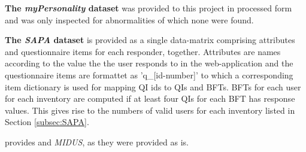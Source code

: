 \textbf{The \textit{myPersonality} dataset} was provided to this project in processed form and was only inspected for abnormalities of which none were found.

\textbf{The \textit{SAPA} dataset} is provided as a single data-matrix comprising attributes and questionnaire items for each responder, together. Attributes are names according to the value the the user responds to in the web-application and the questionnaire items are formattet as 'q\_[id-number]' to which a corresponding item dictionary is used for mapping QI ids to QIs and BFTs. BFTs for each user for each inventory are computed if at least four QIs for each BFT has response values. This gives rise to the numbers of valid users for each inventory listed in Section \ref{subsec:SAPA}.

provides  and \textit{MIDUS}, as they were provided as is.